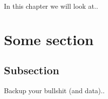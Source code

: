 

In this chapter we will look at..

\section{Some section}

\subsection{Subsection}
Backup your bullshit (and data)..